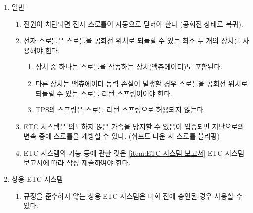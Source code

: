 \documentclass[final,a4paper,10pt]{report}
\begin{document}
\begin{enumerate}
  \item\label{rule:formula-technical.electronic-throttle-control.principles} 일반
    \begin{enumerate}
      \item\label{rule:formula-technical.electronic-throttle-control.principles.power-loss-returns-idle} 전원이 차단되면 전자 스로틀이 자동으로 닫혀야 한다 (공회전 상태로 복귀).

      \item\label{rule:formula-technical.electronic-throttle-control.principles.dual-return-devices} 전자 스로틀은 스로틀을 공회전 위치로 되돌릴 수 있는 최소 두 개의 장치를 사용해야 한다.
        \begin{enumerate}
          \item\label{rule:formula-technical.electronic-throttle-control.principles.dual-return-devices.includes-actuator} 장치 중 하나는 스로틀을 작동하는 장치(액츄에이터)도 포함된다.
          \item\label{rule:formula-technical.electronic-throttle-control.principles.dual-return-devices.throttle-return-spring} 다른 장치는 액츄에이터 동력 손실이 발생할 경우 스로틀을 공회전 위치로 되돌릴 수 있는 스로틀 리턴 스프링이어야 한다.
          \item\label{rule:formula-technical.electronic-throttle-control.principles.dual-return-devices.tps-spring-excluded} TPS의 스프링은 스로틀 리턴 스프링으로 허용되지 않는다.
        \end{enumerate}

      \item\label{rule:formula-technical.electronic-throttle-control.principles.downshift-blipping} ETC 시스템은 의도하지 않은 가속을 방지할 수 있음이 입증되면 저단으로의 변속 중에 스로틀을 개방할 수 있다. (쉬프트 다운 시 스로틀 블리핑)
      \item\label{rule:formula-technical.electronic-throttle-control.principles.documented-in-etcsf} ETC 시스템의 기능 등에 관한 것은 \ref{item:ETC 시스템 보고서} ETC 시스템 보고서에 따라 작성 제출하여야 한다.
    \end{enumerate}

  \item\label{rule:formula-technical.electronic-throttle-control.commercial-systems} 상용 ETC 시스템
    \begin{enumerate}
      \item\label{rule:formula-technical.electronic-throttle-control.commercial-systems.pre-approval-required} 규정을 준수하지 않는 상용 ETC 시스템은 대회 전에 승인된 경우 사용할 수 있다.


\end{enumerate}
\end{enumerate}
\end{document}
